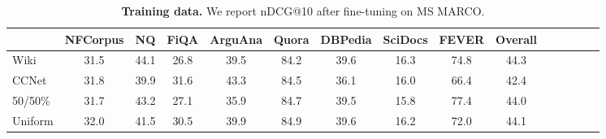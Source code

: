 \begin{table}[h]
  \center
  \small
  \begin{tabular}{l cccccccccccccc}
    \toprule
           & NFCorpus & NQ & FiQA & ArguAna & Quora & DBPedia & SciDocs & FEVER & Overall \\
    \midrule
    Wiki          & 31.5 & 44.1 & 26.8 & 39.5 & 84.2 & 39.6 & 16.3 & 74.8 & 44.3 \\
    CCNet         & 31.8 & 39.9 & 31.6 & 43.3 & 84.5 & 36.1 & 16.0 & 66.4 & 42.4 \\
    50/50\%       & 31.7 & 43.2 & 27.1 & 35.9 & 84.7 & 39.5 & 15.8 & 77.4 & 44.0 \\
    Uniform       & 32.0 & 41.5 & 30.5 & 39.9 & 84.9 & 39.6 & 16.2 & 72.0 & 44.1 \\
    \bottomrule
  \end{tabular}
  \caption{\textbf{Training data.} We report nDCG@10 after fine-tuning on MS MARCO.}
  \label{tab:training_data}
\end{table}

